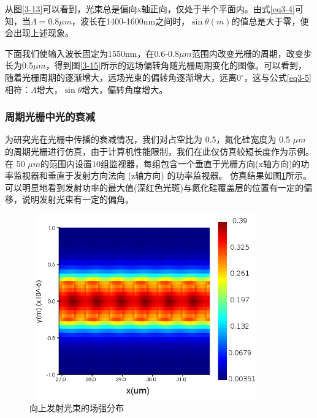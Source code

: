 \documentclass[UTF8,a4paper,12pt]{ctexart}
\numberwithin{equation}{section}
\begin{document}
从图\ref{3-13}可以看到，光束总是偏向x轴正向，仅处于半个平面内。由式\ref{eq3-4}可知，当$\Lambda=0.8\mu m$，波长在1400-1600nm之间时，$\sin\theta(m)$的值总是大于零，便会出现上述现象。

下面我们使输入波长固定为1550nm，在0.6-0.8$\mu m$范围内改变光栅的周期，改变步长为0.5$\mu m$，得到图\ref{3-15}所示的远场偏转角随光栅周期变化的图像。可以看到，随着光栅周期的逐渐增大，远场光束的偏转角逐渐增大，远离0$^\circ$，这与公式\ref{eq3-5}相符：$\Lambda$增大，$\sin{\theta}$增大，偏转角度增大。

\subsubsection{周期光栅中光的衰减}
\label{sec3-3-4}
为研究光在光栅中传播的衰减情况，我们对占空比为 0.5，氮化硅宽度为 0.5
$\mu  m$ 的周期光栅进行仿真，由于计算机性能限制，我们在此仅仿真较短长度作为示例。在 50
$\mu  m$的范围内设置10组监视器，每组包含一个垂直于光栅方向(x轴方向)的功率监视器和垂直于发射方向法向 (z轴方向) 的功率监视器。
仿真结果如图\ref{3-16}所示。可以明显地看到发射功率的最大值(深红色光斑)与氮化硅覆盖层的位置有一定的偏移，说明发射光束有一定的偏角。

\begin{figure}[htbp]
\centering
\includegraphics[height=8cm,width=10cm]{fig27.png}
\caption{向上发射光束的场强分布}
\label{3-16}
\end{figure}
\end{document}
